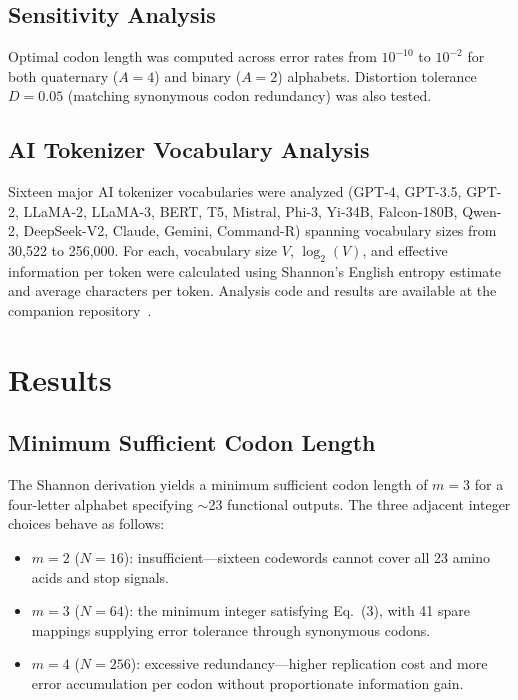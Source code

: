 \documentclass[11pt]{article}
\begin{document}
\subsection{Sensitivity Analysis}

Optimal codon length was computed across error rates from $10^{-10}$ to $10^{-2}$ for both quaternary ($A = 4$) and binary ($A = 2$) alphabets. Distortion tolerance $D = 0.05$ (matching synonymous codon redundancy) was also tested.

\subsection{AI Tokenizer Vocabulary Analysis}

Sixteen major AI tokenizer vocabularies were analyzed (GPT-4, GPT-3.5, GPT-2, LLaMA-2, LLaMA-3, BERT, T5, Mistral, Phi-3, Yi-34B, Falcon-180B, Qwen-2, DeepSeek-V2, Claude, Gemini, Command-R) spanning vocabulary sizes from 30,522 to 256,000. For each, vocabulary size $V$, $\log_2(V)$, and effective information per token were calculated using Shannon's English entropy estimate~\cite{shannon1951} and average characters per token. Analysis code and results are available at the companion repository~\cite{whitmer2026fons_code}.

\section{Results}

\subsection{Minimum Sufficient Codon Length}

The Shannon derivation yields a minimum sufficient codon length of $m = 3$ for a four-letter alphabet specifying $\sim$23 functional outputs. The three adjacent integer choices behave as follows:
\begin{itemize}
    \item $m = 2$ ($N = 16$): insufficient---sixteen codewords cannot cover all 23 amino acids and stop signals.
    \item $m = 3$ ($N = 64$): the minimum integer satisfying Eq.~(3), with 41 spare mappings supplying error tolerance through synonymous codons.
    \item $m = 4$ ($N = 256$): excessive redundancy---higher replication cost and more error accumulation per codon without proportionate information gain.
\end{itemize}
\end{document}
